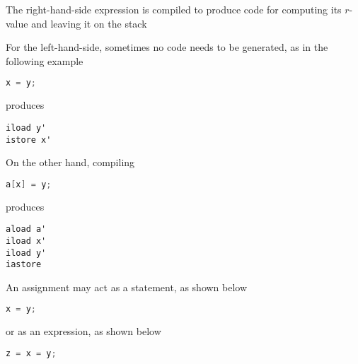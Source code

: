\documentclass[8pt,a4paper,compress]{beamer}
\begin{document}
\begin{frame}[fragile]
\pause

The right-hand-side expression is compiled to produce code for computing its $r$-value and leaving it on the stack

\pause
\bigskip

For the left-hand-side, sometimes no code needs to be generated, as in the following example
\begin{lstlisting}[language=Java]
x = y;
\end{lstlisting}
produces
\begin{lstlisting}[language={}]
iload y'
istore x'
\end{lstlisting}

On the other hand, compiling
\begin{lstlisting}[language=Java]
a[x] = y;
\end{lstlisting}
produces
\begin{lstlisting}[language={}]
aload a'
iload x'
iload y'
iastore
\end{lstlisting}

\pause
\bigskip

An assignment may act as a statement, as shown below
\begin{lstlisting}[language=Java]
x = y;
\end{lstlisting}
or as an expression, as shown below
\begin{lstlisting}[language=Java]
z = x = y;
\end{lstlisting}
\end{frame}
\end{document}
